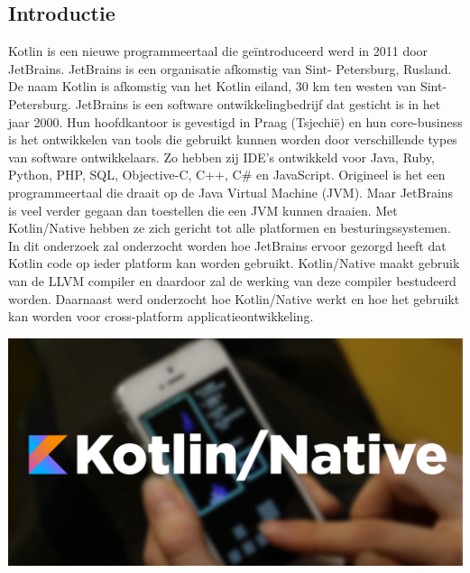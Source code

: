 \documentclass[a0,portrait]{a0poster}
\begin{document}
\begin{multicols}{2}
\color{HoGentAccent1} 
\section*{Introductie}
\color{black}
\color{black}
Kotlin is een nieuwe programmeertaal die ge\"{i}ntroduceerd werd in 2011 door JetBrains. JetBrains is een organisatie afkomstig van Sint- Petersburg, Rusland. De naam Kotlin is afkomstig van het Kotlin eiland, 30 km ten westen van Sint-Petersburg. JetBrains is een software ontwikkelingbedrijf dat gesticht is in het jaar 2000. Hun hoofdkantoor is gevestigd in Praag (Tsjechië) en hun core-business is het ontwikkelen van tools die gebruikt kunnen worden door verschillende types van software ontwikkelaars. Zo hebben zij IDE’s ontwikkeld voor Java, Ruby, Python, PHP, SQL, Objective-C, C++, C\# en JavaScript.
\newline
\newline
Origineel is het een programmeertaal die draait op de Java Virtual Machine (JVM). Maar JetBrains is veel verder gegaan dan toestellen die een JVM kunnen draaien. Met Kotlin/Native hebben ze zich gericht tot alle platformen en besturingssystemen. In dit onderzoek zal onderzocht worden hoe JetBrains ervoor gezorgd heeft dat Kotlin code op ieder platform kan worden gebruikt. Kotlin/Native maakt gebruik van de LLVM compiler en daardoor zal de werking van deze compiler bestudeerd worden. Daarnaast werd onderzocht hoe Kotlin/Native werkt en hoe het gebruikt kan worden voor cross-platform applicatieontwikkeling.

\begin{center}\vspace{1cm}
	\includegraphics[width=1.0\linewidth]{figures/kn.png}
\end{center}\vspace{1cm}


\end{multicols}
\end{document}
